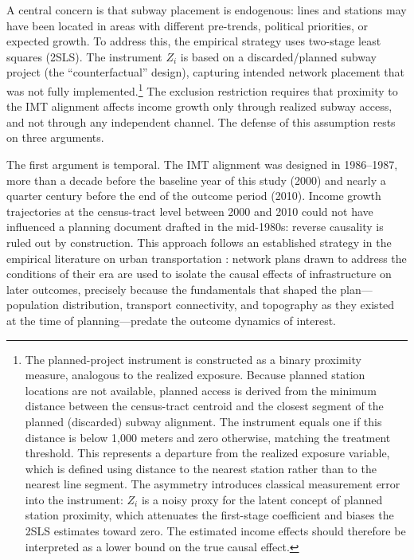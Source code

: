 A central concern is that subway placement is endogenous: lines and stations may have been located in areas with different pre-trends, political priorities, or expected growth. To address this, the empirical strategy uses two-stage least squares (2SLS). The instrument $Z_{i}$ is based on a discarded/planned subway project (the ``counterfactual'' design), capturing intended network placement that was not fully implemented.\footnote{The planned-project instrument is constructed as a binary proximity measure, analogous to the realized exposure. Because planned station locations are not available, planned access is derived from the minimum distance between the census-tract centroid and the closest segment of the planned (discarded) subway alignment. The instrument equals one if this distance is below 1,000 meters and zero otherwise, matching the treatment threshold. This represents a departure from the realized exposure variable, which is defined using distance to the nearest station rather than to the nearest line segment. The asymmetry introduces classical measurement error into the instrument: $Z_{i}$ is a noisy proxy for the latent concept of planned station proximity, which attenuates the first-stage coefficient and biases the 2SLS estimates toward zero. The estimated income effects should therefore be interpreted as a lower bound on the true causal effect.} The exclusion restriction requires that proximity to the IMT alignment affects income growth only through realized subway access, and not through any independent channel. The defense of this assumption rests on three arguments.

The first argument is temporal. The IMT alignment was designed in 1986--1987, more than a decade before the baseline year of this study (2000) and nearly a quarter century before the end of the outcome period (2010). Income growth trajectories at the census-tract level between 2000 and 2010 could not have influenced a planning document drafted in the mid-1980s: reverse causality is ruled out by construction. This approach follows an established strategy in the empirical literature on urban transportation \citep{baumsnow2007highways, severen2023commuting, mayertrevien2017largescale, brinkman2024freeway}: network plans drawn to address the conditions of their era are used to isolate the causal effects of infrastructure on later outcomes, precisely because the fundamentals that shaped the plan---population distribution, transport connectivity, and topography as they existed at the time of planning---predate the outcome dynamics of interest.

